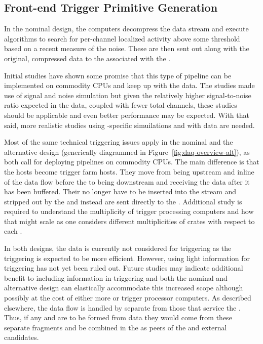 \subsection{Front-end Trigger Primitive Generation}
\label{sec:fd-daq-fetp}

In the nominal design, the  computers decompress the
 data stream and execute algorithms to search for per-channel
localized activity above some threshold based on a recent measure of
the noise. 
These  are then sent out along with the original,
compressed  data to the  associated with the .

Initial studies have shown some promise that this type of  pipeline can be implemented on commodity CPUs and keep up
with the data. 
The studies made use of  signal and noise simulation but
given the relatively higher signal-to-noise ratio expected in the 
data, coupled with fewer total channels, these studies should
be applicable and even better performance may be expected. 
With that said, more realistic studies using -specific
simuilations and with  data are needed.

Most of the same technical triggering issues apply in the nominal and
the alternative design (generically diagrammed in
Figure~\ref{fig:daq-overview-alt}), as both call for deploying  pipelines on commodity CPUs. 
The main difference is that the  hosts become trigger farm
hosts. 
They move from being upstream and inline of the data flow before the
 to being downstream and receiving the data after it has
been buffered. 
Their  no longer have to be inserted into the
stream and stripped out by the  and instead are sent
directly to the . 
Additional study is required to understand the multiplicity of trigger
processing computers and how that might scale as one considers
different multiplicities of   crates with respect to each
.

In both designs, the  data is currently not considered for
triggering as the  triggering is expected to be more
efficient. However, using light information for triggering has not yet
been ruled out. 
Future studies may indicate additional benefit to including
 information in triggering and both the nominal and
alternative design can elastically accommodate this increased scope
although possibly at the cost of either more  or trigger
processor computers.
As described elsewhere, the  data flow is handled by
separate  from those that service the . 
Thus, if any  and  are to
be formed from  data they would come from these separate
fragments and be combined in the  as peers of the
 and external candidates.

